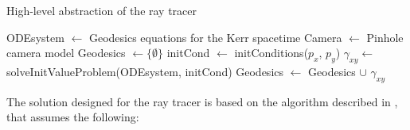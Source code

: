 \begin{algorithm}
	\caption{High-level abstraction of the ray tracer}
	\label{alg:raytracer}
	\begin{algorithmic}[1]
		\State ODEsystem $\gets$ Geodesics equations for the Kerr spacetime
		\State Camera $\gets$ Pinhole camera model
		\State Geodesics $\gets \{\emptyset\}$
			\State initCond $\gets$ initConditions($p_x$, $p_y$)
			\State $\gamma_{xy} \gets$ solveInitValueProblem(ODEsystem, initCond)
			\State Geodesics $\gets$ Geodesics $\cup$ $\gamma_{xy}$
		\EndFor
	\EndFunction
	\end{algorithmic}
\end{algorithm}

The solution designed for the ray tracer is based on the algorithm described in \cite{thorne15}, that assumes the following:
